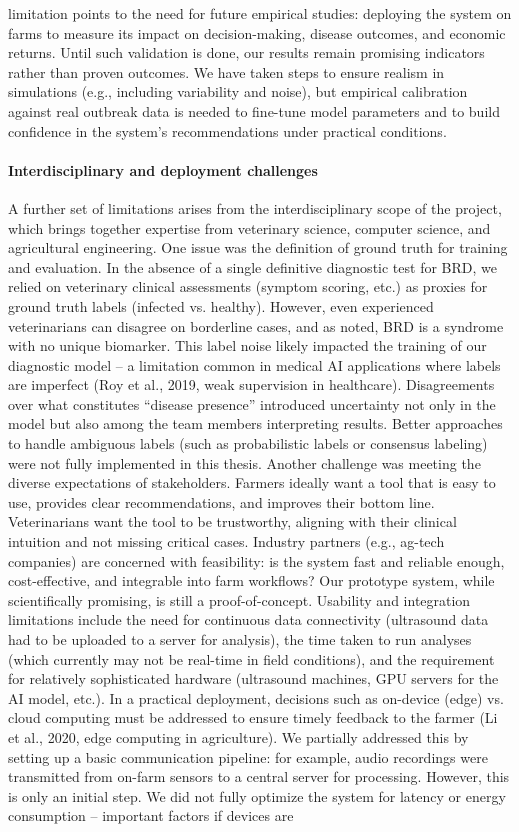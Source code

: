 limitation points to the need for future empirical studies: deploying the system on farms to measure its impact on decision-making, disease outcomes, and economic returns. Until such validation is done, our results remain promising indicators rather than proven outcomes. We have taken steps to ensure realism in simulations (e.g., including variability and noise), but empirical calibration against real outbreak data is needed to fine-tune model parameters and to build confidence in the system’s recommendations under practical conditions.

\paragraph{Interdisciplinary and deployment challenges} A further set of limitations arises from the interdisciplinary scope of the project, which brings together expertise from veterinary science, computer science, and agricultural engineering. One issue was the definition of ground truth for training and evaluation. In the absence of a single definitive diagnostic test for BRD, we relied on veterinary clinical assessments (symptom scoring, etc.) as proxies for ground truth labels (infected vs. healthy). However, even experienced veterinarians can disagree on borderline cases, and as noted, BRD is a syndrome with no unique biomarker. This label noise likely impacted the training of our diagnostic model – a limitation common in medical AI applications where labels are imperfect (Roy et al., 2019, weak supervision in healthcare). Disagreements over what constitutes “disease presence” introduced uncertainty not only in the model but also among the team members interpreting results. Better approaches to handle ambiguous labels (such as probabilistic labels or consensus labeling) were not fully implemented in this thesis. Another challenge was meeting the diverse expectations of stakeholders. Farmers ideally want a tool that is easy to use, provides clear recommendations, and improves their bottom line. Veterinarians want the tool to be trustworthy, aligning with their clinical intuition and not missing critical cases. Industry partners (e.g., ag-tech companies) are concerned with feasibility: is the system fast and reliable enough, cost-effective, and integrable into farm workflows? Our prototype system, while scientifically promising, is still a proof-of-concept. Usability and integration limitations include the need for continuous data connectivity (ultrasound data had to be uploaded to a server for analysis), the time taken to run analyses (which currently may not be real-time in field conditions), and the requirement for relatively sophisticated hardware (ultrasound machines, GPU servers for the AI model, etc.). In a practical deployment, decisions such as on-device (edge) vs. cloud computing must be addressed to ensure timely feedback to the farmer (Li et al., 2020, edge computing in agriculture). We partially addressed this by setting up a basic communication pipeline: for example, audio recordings were transmitted from on-farm sensors to a central server for processing. However, this is only an initial step. We did not fully optimize the system for latency or energy consumption – important factors if devices are 